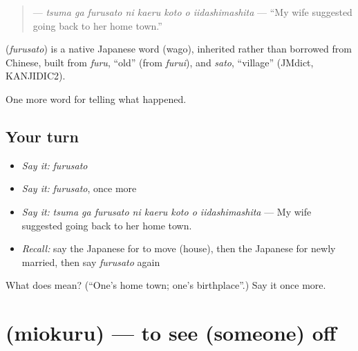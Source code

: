 \begin{quote}
\textbf{    } — \emph{tsuma ga furusato ni kaeru koto o iidashimashita} — \textquotedblleft{}My wife suggested going back to her home town.\textquotedblright{}
\end{quote}

\begin{cousinweb}
\textbf{} (\emph{furusato}) is a native Japanese word (wago), inherited rather than borrowed from Chinese, built from \emph{furu}, \textquotedblleft{}old\textquotedblright{} (from \emph{furui}), and \emph{sato}, \textquotedblleft{}village\textquotedblright{} (JMdict, KANJIDIC2).
\end{cousinweb}

\begin{grammarlens}[title={What you've built}]
One more word for telling what happened.
\end{grammarlens}

\subsection*{Your turn}
\begin{itemize}
\raggedright
  \item \emph{Say it:} \emph{furusato}
  \item \emph{Say it:} \emph{furusato}, once more
  \item \emph{Say it:} \emph{tsuma ga furusato ni kaeru koto o iidashimashita} — My wife suggested going back to her home town.
  \item \emph{Recall:} say the Japanese for to move (house), then the Japanese for newly married, then say \emph{furusato} again
\end{itemize}

\begin{tcolorbox}[breakable,colback=teal!4,colframe=teal!35!black,title={Before you move on}]
What does  mean? (\textquotedblleft{}One's home town; one's birthplace\textquotedblright{}.) Say it once more.
\end{tcolorbox}
\section[\texorpdfstring{\ja{みおくる} (miokuru)}{みおくる (miokuru)}]{ (miokuru) — to see (someone) off}

\label{lesson:JA-C290-miokuru}



